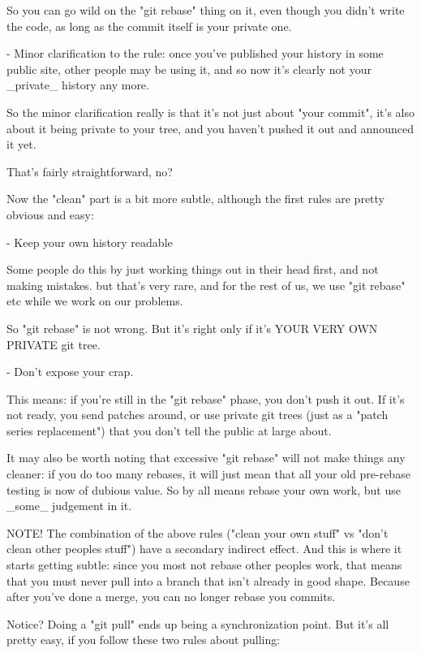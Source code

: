    So you can go wild on the "git rebase" thing on it, even though you 
   didn't write the code, as long as the commit itself is your private 
   one.

 - Minor clarification to the rule: once you've published your history in 
   some public site, other people may be using it, and so now it's clearly 
   not your _private_ history any more.

   So the minor clarification really is that it's not just about "your 
   commit", it's also about it being private to your tree, and you haven't 
   pushed it out and announced it yet.

That's fairly straightforward, no?

Now the "clean" part is a bit more subtle, although the first rules are 
pretty obvious and easy:

 - Keep your own history readable

   Some people do this by just working things out in their head first, and 
   not making mistakes. but that's very rare, and for the rest of us, we 
   use "git rebase" etc while we work on our problems. 

   So "git rebase" is not wrong. But it's right only if it's YOUR VERY OWN 
   PRIVATE git tree.

 - Don't expose your crap.

   This means: if you're still in the "git rebase" phase, you don't push 
   it out. If it's not ready, you send patches around, or use private git 
   trees (just as a "patch series replacement") that you don't tell the 
   public at large about.

It may also be worth noting that excessive "git rebase" will not make 
things any cleaner: if you do too many rebases, it will just mean that all 
your old pre-rebase testing is now of dubious value. So by all means 
rebase your own work, but use _some_ judgement in it.

NOTE! The combination of the above rules ("clean your own stuff" vs "don't 
clean other peoples stuff") have a secondary indirect effect. And this is 
where it starts getting subtle: since you most not rebase other peoples 
work, that means that you must never pull into a branch that isn't already 
in good shape. Because after you've done a merge, you can no longer rebase 
you commits.

Notice? Doing a "git pull" ends up being a synchronization point. But it's 
all pretty easy, if you follow these two rules about pulling:

